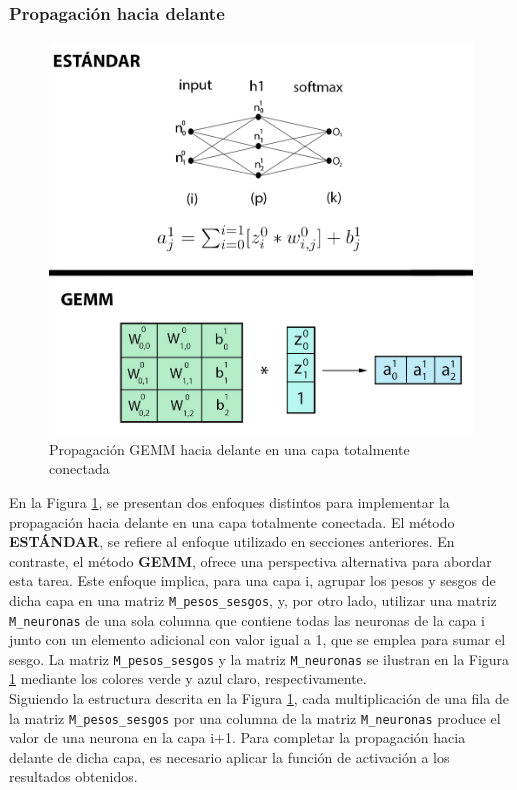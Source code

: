 \subsubsection{Propagación hacia delante}

\begin{figure}[H]
	\centering
	\includegraphics[scale=0.3]{imagenes/gemm_fully_forward.jpg}  
	\caption{Propagación GEMM hacia delante en una capa totalmente conectada}
	\label{fig:gemm_fully_forward}
\end{figure}

En la Figura \ref{fig:gemm_fully_forward}, se presentan dos enfoques distintos para implementar la propagación hacia delante en una capa totalmente conectada. El método \textbf{ESTÁNDAR}, se refiere al enfoque utilizado en secciones anteriores. En contraste, el método \textbf{GEMM}, ofrece una perspectiva alternativa para abordar esta tarea. Este enfoque implica, para una capa i, agrupar los pesos y sesgos de dicha capa en una matriz \texttt{M\_pesos\_sesgos}, y, por otro lado, utilizar una matriz \texttt{M\_neuronas} de una sola columna que contiene todas las neuronas de la capa i junto con un elemento adicional con valor igual a 1, que se emplea para sumar el sesgo. La matriz \texttt{M\_pesos\_sesgos} y la matriz \texttt{M\_neuronas} se ilustran en la Figura \ref{fig:gemm_fully_forward} mediante los colores verde y azul claro, respectivamente. \\
Siguiendo la estructura descrita en la Figura \ref{fig:gemm_fully_forward}, cada multiplicación de una fila de la matriz \texttt{M\_pesos\_sesgos} por una columna de la matriz \texttt{M\_neuronas} produce el valor de una neurona en la capa i+1. Para completar la propagación hacia delante de dicha capa, es necesario aplicar la función de activación a los resultados obtenidos.

